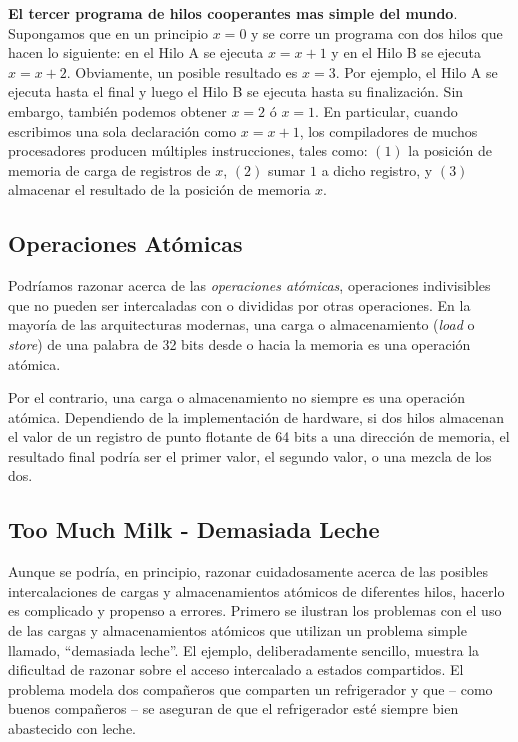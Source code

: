 \documentclass[10pt]{book}
\begin{document}
\textbf{El tercer programa de hilos cooperantes mas simple del mundo}. Supongamos que en un principio $x = 0$ y se corre un programa con dos hilos que hacen lo siguiente: en el Hilo A se ejecuta $x = x + 1$ y en el Hilo B se ejecuta $x = x + 2$. Obviamente, un posible resultado es $x = 3$. Por ejemplo, el Hilo A se ejecuta hasta el final y luego el Hilo B se ejecuta hasta su finalización. Sin embargo, también podemos obtener $x = 2$ ó $x = 1$. En particular, cuando escribimos una sola declaración como $x = x + 1$, los compiladores de muchos procesadores producen múltiples instrucciones, tales como: $(1)$ la posición de memoria de carga de registros de $x$, $(2)$ sumar $1$ a dicho registro, y $(3)$ almacenar el resultado de la posición de memoria $x$.

\subsection{Operaciones Atómicas}
Podríamos razonar acerca de las \textit{operaciones atómicas}, operaciones indivisibles que no pueden ser intercaladas con o divididas por otras operaciones. En la mayoría de las arquitecturas modernas, una carga o almacenamiento (\textit{load} o \textit{store}) de una palabra de 32 bits desde o hacia la memoria es una operación atómica.

Por el contrario, una carga o almacenamiento no siempre es una operación atómica. Dependiendo de la implementación de hardware, si dos hilos almacenan el valor de un registro de punto flotante de 64 bits a una dirección de memoria, el resultado final podría ser el primer valor, el segundo valor, o una mezcla de los dos.

\subsection{Too Much Milk - Demasiada Leche}
Aunque se podría, en principio, razonar cuidadosamente acerca de las posibles intercalaciones de cargas y almacenamientos atómicos de diferentes hilos, hacerlo es complicado y propenso a errores. Primero se ilustran los problemas con el uso de las cargas y almacenamientos atómicos que utilizan un problema simple llamado, ``demasiada leche''. El ejemplo, deliberadamente sencillo, muestra la dificultad de razonar sobre el acceso intercalado a estados compartidos. El problema modela dos compañeros que comparten un refrigerador y que -- como buenos compañeros -- se aseguran de que el refrigerador esté siempre bien abastecido con leche.
\end{document}
